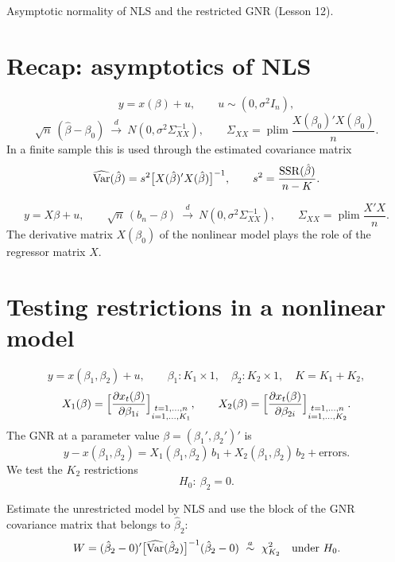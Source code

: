 \documentclass[11pt]{article}
\begin{document}

 Asymptotic normality of NLS and the restricted GNR (Lesson 12).

\section{Recap: asymptotics of NLS}

\[ y = x(\beta) + u, \qquad u \sim (0,\sigma^{2}I_{n}), \]
\[ \sqrt{n}\,(\hat\beta-\beta_{0}) \ \xrightarrow{\ d\ }\ N(0,\sigma^{2}\Sigma_{XX}^{-1}),
   \qquad \Sigma_{XX}=\operatorname*{plim}\frac{X(\beta_{0})'X(\beta_{0})}{n}. \]
In a finite sample this is used through the estimated covariance matrix
\[ \widehat{\operatorname{Var}}(\hat\beta)=s^{2}\bigl[X(\hat\beta)'X(\hat\beta)\bigr]^{-1},
   \qquad s^{2}=\frac{\operatorname{SSR}(\hat\beta)}{n-K}. \]

\[ y=X\beta+u, \qquad
   \sqrt{n}\,(b_{n}-\beta)\ \xrightarrow{\ d\ }\ N(0,\sigma^{2}\Sigma_{XX}^{-1}),
   \qquad \Sigma_{XX}=\operatorname*{plim}\frac{X'X}{n}. \]
The derivative matrix $X(\beta_{0})$ of the nonlinear model plays the role of the
regressor matrix $X$.

\section{Testing restrictions in a nonlinear model}

\[ y=x(\beta_{1},\beta_{2})+u, \qquad
   \beta_{1}:K_{1}\times 1,\quad \beta_{2}:K_{2}\times 1,\quad K=K_{1}+K_{2}, \]
\[ X_{1}(\beta)=\Bigl[\frac{\partial x_{t}(\beta)}{\partial\beta_{1i}}\Bigr]
     _{\substack{t=1,\ldots,n\\ i=1,\ldots,K_{1}}},
   \qquad
   X_{2}(\beta)=\Bigl[\frac{\partial x_{t}(\beta)}{\partial\beta_{2i}}\Bigr]
     _{\substack{t=1,\ldots,n\\ i=1,\ldots,K_{2}}}. \]
The GNR at a parameter value $\beta=(\beta_{1}',\beta_{2}')'$ is
\[ y-x(\beta_{1},\beta_{2})=X_{1}(\beta_{1},\beta_{2})\,b_{1}
   +X_{2}(\beta_{1},\beta_{2})\,b_{2}+\text{errors}. \]
We test the $K_{2}$ restrictions
\[ H_{0}:\ \beta_{2}=0. \]

Estimate the unrestricted model by NLS and use the block of the GNR covariance
matrix that belongs to $\hat\beta_{2}$:
\[ W=(\hat\beta_{2}-0)'\bigl[\widehat{\operatorname{Var}}(\hat\beta_{2})\bigr]^{-1}(\hat\beta_{2}-0)
   \ \overset{a}{\sim}\ \chi^{2}_{K_{2}} \quad\text{under }H_{0}. \]
\end{document}
